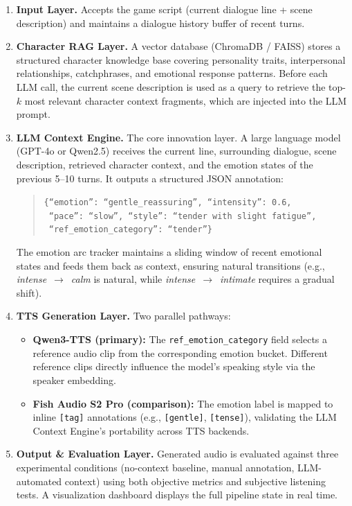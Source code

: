 \documentclass[11pt,a4paper]{article}
\begin{document}
\begin{enumerate}
    \item \textbf{Input Layer.} Accepts the game script (current dialogue line + scene description) and maintains a dialogue history buffer of recent turns.

    \item \textbf{Character RAG Layer.} A vector database (ChromaDB / FAISS) stores a structured character knowledge base covering personality traits, interpersonal relationships, catchphrases, and emotional response patterns. Before each LLM call, the current scene description is used as a query to retrieve the top-$k$ most relevant character context fragments, which are injected into the LLM prompt.

    \item \textbf{LLM Context Engine.} The core innovation layer. A large language model (GPT-4o or Qwen2.5) receives the current line, surrounding dialogue, scene description, retrieved character context, and the emotion states of the previous 5--10 turns. It outputs a structured JSON annotation:

    \begin{quote}
    \texttt{\{``emotion'': ``gentle\_reassuring'', ``intensity'': 0.6,} \\
    \texttt{~``pace'': ``slow'', ``style'': ``tender with slight fatigue'',} \\
    \texttt{~``ref\_emotion\_category'': ``tender''\}}
    \end{quote}

    The emotion arc tracker maintains a sliding window of recent emotional states and feeds them back as context, ensuring natural transitions (e.g., \emph{intense}~$\to$~\emph{calm} is natural, while \emph{intense}~$\to$~\emph{intimate} requires a gradual shift).

    \item \textbf{TTS Generation Layer.} Two parallel pathways:
    \begin{itemize}
        \item \textbf{Qwen3-TTS (primary):} The \texttt{ref\_emotion\_category} field selects a reference audio clip from the corresponding emotion bucket. Different reference clips directly influence the model's speaking style via the speaker embedding.
        \item \textbf{Fish Audio S2 Pro (comparison):} The emotion label is mapped to inline \texttt{[tag]} annotations (e.g., \texttt{[gentle]}, \texttt{[tense]}), validating the LLM Context Engine's portability across TTS backends.
    \end{itemize}

    \item \textbf{Output \& Evaluation Layer.} Generated audio is evaluated against three experimental conditions (no-context baseline, manual annotation, LLM-automated context) using both objective metrics and subjective listening tests. A visualization dashboard displays the full pipeline state in real time.
\end{enumerate}
\end{document}
